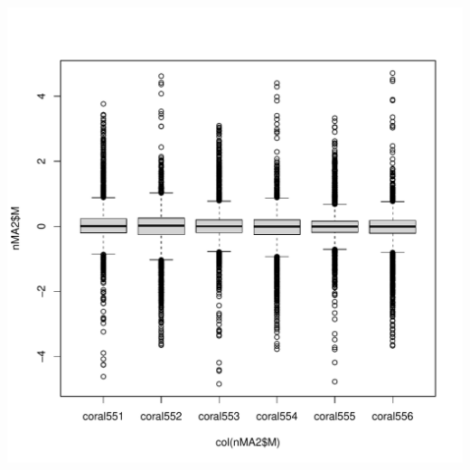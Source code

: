 \documentclass[a4paper,9pt]{article}\usepackage[]{graphicx}\usepackage[]{xcolor}
\makeatletter
\def\maxwidth{ %
  \ifdim\Gin@nat@width>\linewidth
    \linewidth
  \else
    \Gin@nat@width
  \fi
}
\newenvironment{knitrout}{}{} %
\makeatother
\begin{document}
\begin{knitrout}
\includegraphics[width=\maxwidth]{figure/unnamed-chunk-22-2} 
\end{knitrout}
\end{document}

